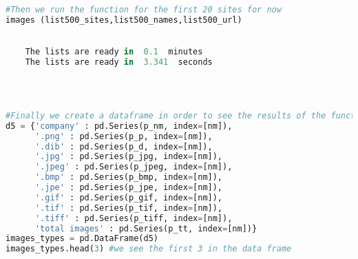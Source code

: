 \documentclass{article}
\begin{document}
\begin{lstlisting}[language=Python]
 
#Then we run the function for the first 20 sites for now
images (list500_sites,list500_names,list500_url)
 

    The lists are ready in  0.1  minutes
    The lists are ready in  3.341  seconds
    


 
#Finally we create a dataframe in order to see the results of the function
d5 = {'company' : pd.Series(p_nm, index=[nm]),
      '.png' : pd.Series(p_p, index=[nm]),
      '.dib' : pd.Series(p_d, index=[nm]),
      '.jpg' : pd.Series(p_jpg, index=[nm]),
      '.jpeg' : pd.Series(p_jpeg, index=[nm]),
      '.bmp' : pd.Series(p_bmp, index=[nm]),
      '.jpe' : pd.Series(p_jpe, index=[nm]),
      '.gif' : pd.Series(p_gif, index=[nm]),
      '.tif' : pd.Series(p_tif, index=[nm]),
      '.tiff' : pd.Series(p_tiff, index=[nm]), 
      'total images' : pd.Series(p_tt, index=[nm])}
images_types = pd.DataFrame(d5)    
images_types.head(3) #we see the first 3 in the data frame
\end{lstlisting}
\end{document}
